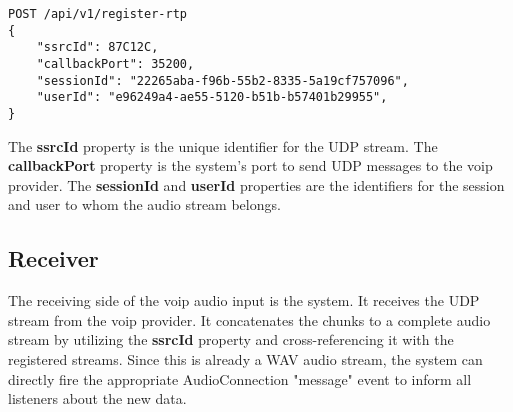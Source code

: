 \begin{verbatim}
POST /api/v1/register-rtp
{
    "ssrcId": 87C12C,
    "callbackPort": 35200,
    "sessionId": "22265aba-f96b-55b2-8335-5a19cf757096",
    "userId": "e96249a4-ae55-5120-b51b-b57401b29955",
}
\end{verbatim}

The \textbf{ssrcId} property is the unique identifier for the UDP stream. The \textbf{callbackPort} property is the 
system's port to send UDP messages to the \ac{voip} provider. The \textbf{sessionId} and \textbf{userId} properties are 
the identifiers for the session and user to whom the audio stream belongs.

\subsection{Receiver}

The receiving side of the \ac{voip} audio input is the system. It receives the UDP stream from the \ac{voip} provider. 
It concatenates the chunks to a complete audio stream by utilizing the \textbf{ssrcId} property and cross-referencing 
it with the registered streams. Since this is already a WAV audio stream, the system can directly fire the appropriate 
AudioConnection "message" event to inform all listeners about the new data.
